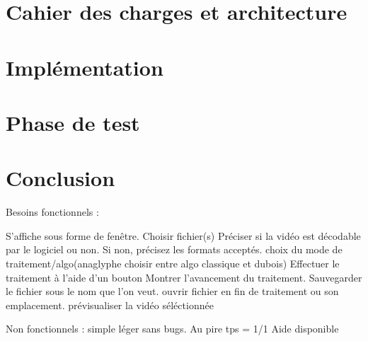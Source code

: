 \documentclass[10pt,a4paper]{article}
\begin{document}
\section{Cahier des charges et architecture}
\section{Implémentation}
\section{Phase de test}

\section{Conclusion}





Besoins fonctionnels : 

S'affiche sous forme de fenêtre.
Choisir fichier(s)
Préciser si la vidéo est décodable par le logiciel ou non. Si non, précisez les formats acceptés.
choix du mode de traitement/algo(anaglyphe choisir entre algo classique et dubois)
Effectuer le traitement à l'aide d'un bouton
Montrer l'avancement du traitement.
Sauvegarder le fichier sous le nom que l'on veut.
ouvrir fichier en fin de traitement ou son emplacement.
prévisualiser la vidéo séléctionnée

Non fonctionnels :
simple
léger
sans bugs.
Au pire tps = 1/1
Aide disponible 
\end{document}
